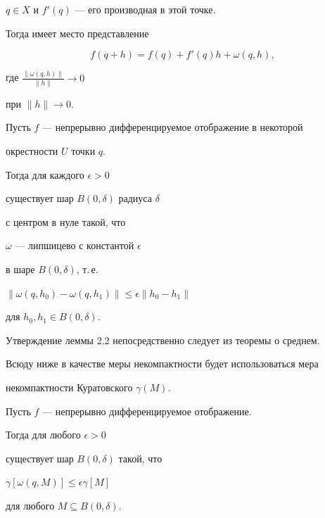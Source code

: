 $q\in X$ и $f'(q)$ --- его производная в этой точке.


Тогда имеет место представление


\begin{equation}


f(q+h) = f(q) + f' (q) h + \omega (q,h),


\end{equation}


где $\frac {\|\omega (q,h)\|}{\| h \|} \to 0$


при $\| h \| \to 0$.





\begin{lems}


Пусть $f$ --- непрерывно дифференцируемое отображение в некоторой 


окрестности $U$ точки $q$.


Тогда для каждого $\epsilon > 0$


существует шар $B(0,\delta)$ радиуса $\delta$


с центром в нуле такой, что 


$\omega$ --- липшицево с константой $\epsilon$


в шаре $B(0,\delta)$, т.\,е.


$\| \omega (q,h_0) - \omega (q,h_1) \| \leq \epsilon 


\| h_0 - h_1 \|$


для $h_0, h_1 \in B(0,\delta)$.


\end{lems}





Утверждение леммы 2.2 непосредственно следует из теоремы о среднем.





Всюду ниже в качестве меры некомпактности будет использоваться мера


некомпактности Куратовского $\gamma (M)$.





\begin{cors}


Пусть $f$ --- непрерывно дифференцируемое отображение.


Тогда для любого $\epsilon > 0$


существует шар $B(0,\delta)$ такой, что 


$\gamma [\omega (q,M)] \leq \epsilon \gamma [M]$


для любого $M \subseteq B(0,\delta)$.


\end{cors}





